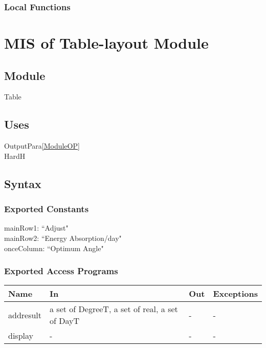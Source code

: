 \documentclass[12pt, titlepage]{article}
\begin{document}
\subsubsection{Local Functions}



\newpage



\section{MIS of Table-layout Module} \label{ModuleT} 

\subsection{Module}
Table\\

\subsection{Uses}
OutputPara\ref{ModuleOP}\\
HardH\\


\subsection{Syntax}

\subsubsection{Exported Constants}

mainRow1:  ``Adjust"\\
mainRow2: ``Energy Absorption/day"\\
onceColumn: ``Optimum Angle" \\


\subsubsection{Exported Access Programs}

\begin{center}
\begin{tabular}{p{2cm} p{5cm} p{5cm} p{2cm}}
\hline
\textbf{Name} & \textbf{In} & \textbf{Out} & \textbf{Exceptions} \\
\hline 
addresult &  a set of DegreeT, a set of real, a set of DayT & - & - \\
display & - & - & - \\

\hline
\end{tabular}
\end{center}
\end{document}
